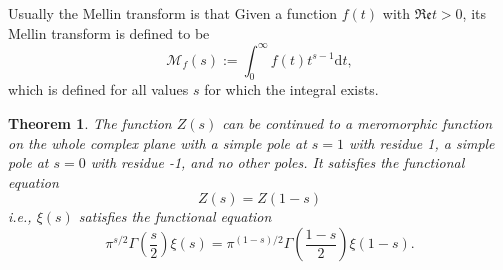 \documentclass[12pt,a4paper,english]{article}
\theoremstyle{plain}
\newtheorem{thm}{Theorem}[section]
\theoremstyle{definition}
\begin{document}
Usually the Mellin transform is that Given a function $f(t)$ with $\mathfrak{Re}t>0$, its Mellin transform is defined to be
\begin{equation*}
    \mathcal{M}_{f}(s):=\int^{\infty}_{0}f(t)t^{s-1}\text{d}t,
\end{equation*}
which is defined for all values $s$ for which the integral exists.
\begin{thm}
The function $Z(s)$ can be continued to a meromorphic function on the whole complex plane with a simple pole at $s=1$ with residue 1, a simple pole at $s=0$ with residue -1, and no other poles. It satisfies the functional equation 
\begin{equation*}
        Z(s)=Z(1-s)
\end{equation*}
i.e., $\xi(s)$ satisfies the functional equation
\begin{equation*}        \pi^{s
/2}\Gamma(\frac{s}{2})\xi(s)=\pi^{(1-s)/2}\Gamma(\frac{1-s}{2})\xi(1-s).
\end{equation*}
\end{thm}
\end{document}
